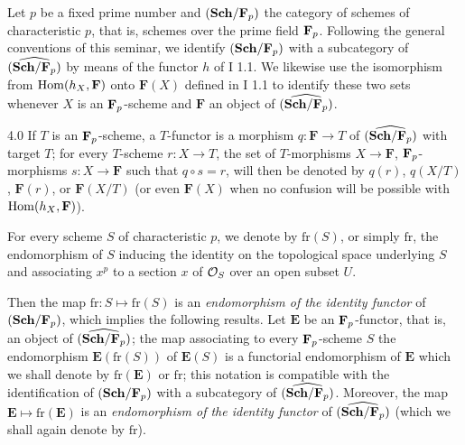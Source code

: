 Let $p$ be a fixed prime number and $(\mathbf{Sch}/\mathbf{F}_p)$ the category of schemes of characteristic $p$, that is, schemes over the prime field $\mathbf{F}_p$. Following the general conventions of this seminar, we identify $(\mathbf{Sch}/\mathbf{F}_p)$ with a subcategory of $\widehat{(\mathbf{Sch}/\mathbf{F}_p)}$ by means of the functor $h$ of I 1.1. We likewise use the isomorphism from $\operatorname{Hom}(h_X,\mathbf F)$ onto $\mathbf F(X)$ defined in I 1.1 to identify these two sets whenever $X$ is an $\mathbf{F}_p$-scheme and $\mathbf F$ an object of $\widehat{(\mathbf{Sch}/\mathbf{F}_p)}$.

\begin{notation}{4.0}\label{VIIA.4.0}
If $T$ is an $\mathbf{F}_p$-scheme, a $T$-functor is a morphism $q:\mathbf F\to T$ of $\widehat{(\mathbf{Sch}/\mathbf{F}_p)}$ with target $T$; for every $T$-scheme $r:X\to T$, the set of $T$-morphisms $X\to\mathbf F$, \ie $\mathbf{F}_p$-morphisms $s:X\to\mathbf F$ such that $q\circ s=r$, will then be denoted by $q(r)$, $q(X/T)$, $\mathbf F(r)$, or $\mathbf F(X/T)$ (or even $\mathbf F(X)$ when no confusion will be possible with $\operatorname{Hom}(h_X,\mathbf F)$).
\end{notation}

For every scheme $S$ of characteristic $p$, we denote by $\mathrm{fr}(S)$, or simply $\mathrm{fr}$, the endomorphism of $S$ inducing the identity on the topological space underlying $S$ and associating $x^p$ to a section $x$ of $\mathcal{O}_S$ over an open subset $U$.

Then the map $\mathrm{fr}:S\mapsto\mathrm{fr}(S)$ is an \emph{endomorphism of the identity functor} of $(\mathbf{Sch}/\mathbf{F}_p)$, which implies the following results. Let $\mathbf E$ be an $\mathbf{F}_p$-functor, that is, an object of $\widehat{(\mathbf{Sch}/\mathbf{F}_p)}$; the map associating to every $\mathbf{F}_p$-scheme $S$ the endomorphism $\mathbf E(\mathrm{fr}(S))$ of $\mathbf E(S)$ is a functorial endomorphism of $\mathbf E$ which we shall denote by $\mathrm{fr}(\mathbf E)$ or $\mathrm{fr}$; this notation is compatible with the identification of $(\mathbf{Sch}/\mathbf{F}_p)$ with a subcategory of $\widehat{(\mathbf{Sch}/\mathbf{F}_p)}$. Moreover, the map $\mathbf E\mapsto\mathrm{fr}(\mathbf E)$ is an \emph{endomorphism of the identity functor} of $\widehat{(\mathbf{Sch}/\mathbf{F}_p)}$ (which we shall again denote by $\mathrm{fr}$).

